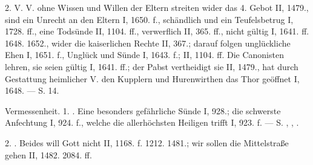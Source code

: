 2.  V. V. ohne Wissen und Willen der Eltern streiten wider das 4. Gebot II, 1479., sind ein Unrecht an den Eltern I, 1650. f., schändlich und ein Teufelsbetrug I, 1728. ff., eine Todsünde II, 1104. ff., verwerflich II, 365. ff., nicht gültig I, 1641. ff. 1648. 1652., wider die kaiserlichen Rechte II, 367.; darauf folgen unglückliche Ehen I, 1651. f., Unglück und Sünde I, 1643. f.; II, 1104. ff. Die Canonisten lehren, sie seien gültig I, 1641. ff.; der Pabst vertheidigt sie II, 1479., hat durch Gestattung heimlicher V. den Kupplern und Hurenwirthen das Thor geöffnet I, 1648. — S.  14.

Vermessenheit. 1. . Eine besonders gefährliche Sünde I, 928.; die schwerste Anfechtung I, 924. f., welche die allerhöchsten Heiligen trifft I, 923. f. — S. , , .

2. . Beides will Gott nicht II, 1168. f. 1212. 1481.; wir sollen die Mittelstraße gehen II, 1482. 2084. ff.

